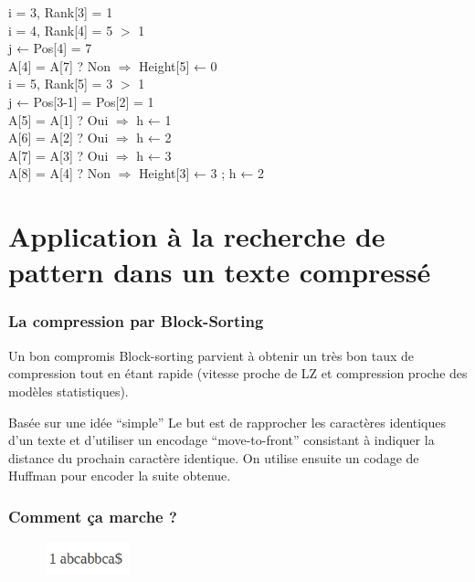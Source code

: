 \documentclass[10pt]{beamer}
\begin{document}
\begin{frame}
\begin{multicols}{2}
  \pause
  i = 3, Rank[3] = 1\\
  \pause
  i = 4, Rank[4] = 5 $>$ 1\\
         j ← Pos[4] = 7\\
           A[4] = A[7] ? Non $\Rightarrow$ Height[5] ← 0\\
  \pause
  i = 5, Rank[5] = 3 $>$ 1\\
         j ← Pos[3-1] = Pos[2] = 1\\
           A[5] = A[1] ? Oui $\Rightarrow$ h ← 1\\
           A[6] = A[2] ? Oui $\Rightarrow$ h ← 2\\
           A[7] = A[3] ? Oui $\Rightarrow$ h ← 3\\
           A[8] = A[4] ? Non $\Rightarrow$ Height[3] ← 3 ; h ← 2\\

  \end{multicols}
  \normalsize
\end{frame}


\section{Application à la recherche de pattern dans un texte compressé}
\label{sec:appcompress}

\begin{frame}
  \frametitle{La compression par Block-Sorting}

  \begin{block}{Un bon compromis}
    Block-sorting parvient à obtenir un très bon taux de compression
    tout en étant rapide (vitesse proche de LZ et compression proche
    des modèles statistiques\cite{Burrows94}).
  \end{block}

  \begin{block}{Basée sur une idée ``simple''}
    Le but est de rapprocher les caractères identiques d'un texte et
    d'utiliser un encodage ``move-to-front'' consistant à indiquer la
    distance du prochain caractère identique. On utilise ensuite un
    codage de Huffman pour encoder la suite obtenue.
  \end{block}


\end{frame}

\begin{frame}
  \frametitle{Comment ça marche ?}
  \begin{figure}
    \includegraphics[width=0.22\textwidth]{start_burrows}
  \end{figure}

\end{frame}
\end{document}
